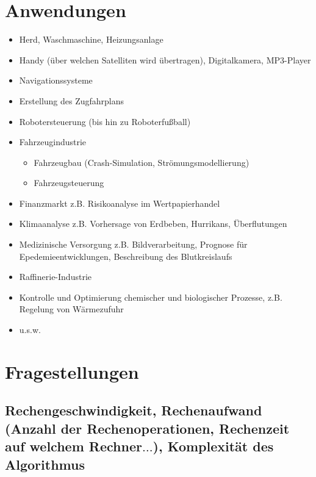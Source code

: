 \documentclass[ngerman,fontsize=11pt, paper=a4, parskip=half, titlepage=true, toc=bib]{scrbook}
\begin{document}
\section{Anwendungen}
    \begin{itemize}
    	\item Herd, Waschmaschine, Heizungsanlage
    	\item Handy (über welchen Satelliten wird übertragen),
    	Digitalkamera, MP3-Player
    	\item Navigationssysteme
    	\item Erstellung des Zugfahrplans
    	\item Robotersteuerung (bis hin zu Roboterfußball)
    	\item Fahrzeugindustrie
    	\begin{itemize}
    		\item Fahrzeugbau (Crash-Simulation,
    		Strömungsmodellierung)
    		\item Fahrzeugsteuerung
    		\end{itemize}
   		\item Finanzmarkt z.B. Risikoanalyse im Wertpapierhandel
   		\item Klimaanalyse z.B. Vorhersage von Erdbeben, Hurrikans,
    		Überflutungen
    		 \item Medizinische Versorgung z.B. Bildverarbeitung, Prognose
    		 für Epedemieentwicklungen, Beschreibung des Blutkreislaufs
    		 \item Raffinerie-Industrie
    		 \item Kontrolle und Optimierung chemischer und biologischer
    		 Prozesse, z.B. Regelung von Wärmezufuhr
    		 \item u.s.w.
   \end{itemize}
   
   \section*{Fragestellungen}
   \subsection*{Rechengeschwindigkeit, Rechenaufwand (Anzahl der
    	Rechenoperationen, Rechenzeit auf welchem Rechner$\dots$),
    	Komplexität des Algorithmus}
    
\end{document}
